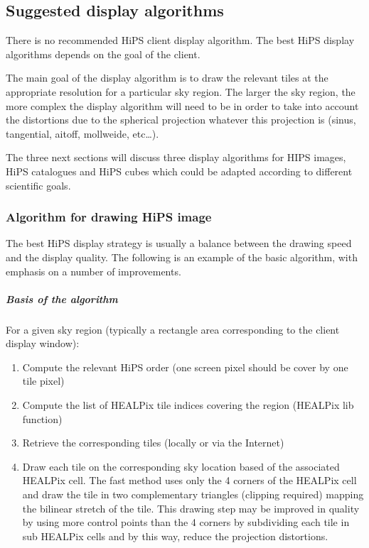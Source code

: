 \documentclass[11pt,a4paper]{ivoa}
\begin{document}
\subsection{Suggested display algorithms}

There is no recommended HiPS client display algorithm. The best HiPS display algorithms depends on the goal of the client.

The main goal of the display algorithm is to draw the relevant tiles at the appropriate resolution for a particular sky region. The larger the sky region, the more complex the display algorithm will need to be in order to take into account the distortions due to the spherical projection whatever this projection is (sinus, tangential, aitoff, mollweide, etc…).

The three next sections will discuss three display algorithms for HIPS images, HiPS catalogues and HiPS cubes which could be adapted according to different scientific goals.

\subsubsection{Algorithm for drawing HiPS image}

The best HiPS display strategy is usually a balance between the drawing speed and the display quality. The following is an example of the basic algorithm, with emphasis on a number of improvements.

\subparagraph{Basis of the algorithm}
For a given sky region (typically a rectangle area corresponding to the client display window):
\begin{enumerate}
\item Compute the relevant HiPS order (one screen pixel should be cover by one tile pixel)
\item Compute the list of HEALPix tile indices covering the region (HEALPix lib function)
\item Retrieve the corresponding tiles (locally or via the Internet)
\item Draw each tile on the corresponding sky location based of the associated HEALPix cell. The fast method uses only the 4 corners of the HEALPix cell and draw the tile in two complementary triangles (clipping required) mapping the bilinear stretch of the tile. This drawing step may be improved in quality by using more control points than the 4 corners by subdividing each tile in sub HEALPix cells and by this way, reduce the projection distortions.
\end{enumerate}
\end{document}
